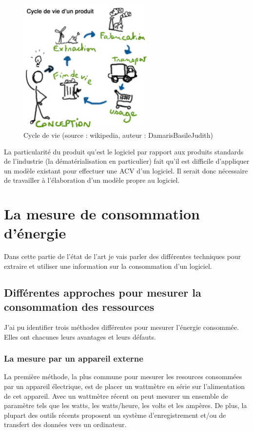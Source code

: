 \documentclass[a4paper, 11pt]{report}
\begin{document}
\begin{figure}
	\centering
	\includegraphics[width=0.6\textwidth]{figures/Cycle-de-vie}
	\caption{Cycle de vie (source : wikipedia, auteur : DamarisBasileJudith)}
	\label{CdV}
\end{figure}

La particularité du produit qu'est le logiciel par rapport aux produits standards de l'industrie (la dématérialisation en particulier) fait qu'il est difficile d'appliquer un modèle existant pour effectuer une ACV d'un logiciel. Il serait donc nécessaire de travailler à l'élaboration d'un modèle propre au logiciel.
			\subsubsection{}
			
		
	\section{La mesure de consommation d'énergie}
Dans cette partie de l'état de l'art je vais parler des différentes techniques pour extraire et utiliser une information sur la consommation d'un logiciel.
		\subsection{Différentes approches pour mesurer la consommation des ressources}
J'ai pu identifier trois méthodes différentes pour mesurer l'énergie consommée. Elles ont chacunes leurs avantages et leurs défauts.
			\subsubsection{La mesure par un appareil externe}
La première méthode, la plus commune pour mesurer les resources consommées par un appareil électrique, est de placer un wattmètre en série sur l'alimentation de cet appareil. Avec un wattmètre récent on peut mesurer un ensemble de paramètre tels que les watts, les watts/heure, les volts et les ampères. De plus, la plupart des outils récents proposent un système d'enregistrement et/ou de transfert des données vers un ordinateur.
\end{document}
